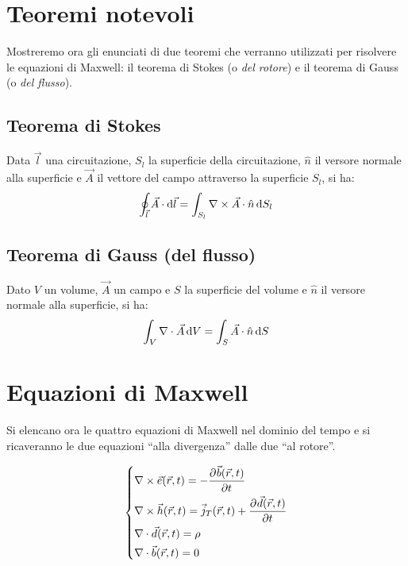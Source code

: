 \section{Teoremi notevoli}
Mostreremo ora gli enunciati di due teoremi che verranno utilizzati per risolvere le equazioni di Maxwell: il teorema di Stokes (o \emph{del rotore}) e il teorema di Gauss (o \emph{del flusso}).

\subsection{Teorema di Stokes}
Data $\vec{l}$ una circuitazione, $S_l$ la superficie della circuitazione, $\hat{n}$ il versore normale alla superficie	 e $\vec{A}$ il vettore del campo attraverso la superficie $S_l$, si ha:
\begin{equation}
	\oint_{\vec{l}} \vec{A} \cdot \mathop{}\!\mathrm{d} \vec{l} = \int_{S_l}\nabla\times \vec{A} \cdot \hat{n} \mathop{}\!\mathrm{d} S_l
\end{equation}

\subsection{Teorema di Gauss (del flusso)}
Dato $V$ un volume, $\vec{A}$ un campo e $S$ la superficie del volume e $\hat{n}$
il versore normale alla superficie, si ha:
\begin{equation}
	\int_V \nabla\cdot \vec{A} \mathop{}\!\mathrm{d} V = \int_S \vec{A}\cdot \hat{n} \mathop{}\!\mathrm{d} S
\end{equation}

\section{Equazioni di Maxwell}
Si elencano ora le quattro equazioni di Maxwell nel dominio del tempo e si ricaveranno le due equazioni ``alla divergenza'' dalle due ``al rotore''.

\begin{equation}\begin{dcases}
	\nabla\times \vec{e}(\vec{r},t) = -\frac{\partial^{} {\vec{b}(\vec{r},t)}}{\partial {t}^{}} \\
	\nabla\times \vec{h}(\vec{r},t) = \vec{j}_T(\vec{r},t) + \frac{\partial^{} {\vec{d}(\vec{r},t)}}{\partial {t}^{}} \\
	\nabla\cdot \vec{d}(\vec{r},t) = \rho \\
	\nabla\cdot \vec{b}(\vec{r},t) = 0
\end{dcases}\label{eq:maxwell}\end{equation}


